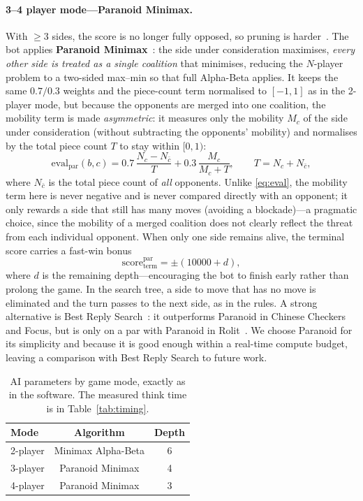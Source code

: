 \paragraph{3--4 player mode---Paranoid Minimax.} With $\ge 3$ sides, the
score is no longer fully opposed, so pruning is
harder~\citep{korf1991multiplayer,sturtevant2000pruning}. The bot applies
\textbf{Paranoid Minimax}~\citep{sturtevant2000pruning,sturtevant2003comparison}:
the side under consideration maximises,
\emph{every other side is treated as a single coalition} that minimises,
reducing the $N$-player problem to a two-sided max--min so that full
Alpha-Beta applies. It keeps the same $0.7/0.3$ weights and the piece-count
term normalised to $[-1,1]$ as in the 2-player mode, but because the
opponents are merged into one coalition, the mobility term is made
\emph{asymmetric}: it measures only the mobility $M_c$ of the side under
consideration (without subtracting the opponents' mobility) and normalises
by the total piece count $T$ to stay within $[0,1)$:
\begin{equation}
\mathrm{eval}_{\text{par}}(b,c)=0.7\,\frac{N_c-N_{\bar c}}{T}
+0.3\,\frac{M_c}{M_c+T},\qquad T=N_c+N_{\bar c},
\label{eq:evalpar}
\end{equation}
where $N_{\bar c}$ is the total piece count of \emph{all} opponents. Unlike
\eqref{eq:eval}, the mobility term here is never negative and is never
compared directly with an opponent; it only rewards a side that still has
many moves (avoiding a blockade)---a pragmatic choice, since the mobility
of a merged coalition does not clearly reflect the threat from each
individual opponent. When only one side remains alive, the terminal score
carries a fast-win bonus
\begin{equation}
\mathrm{score}^{\text{par}}_{\text{term}}=\pm(10000+d),
\label{eq:termpar}
\end{equation}
where $d$ is the remaining depth---encouraging the bot to finish early
rather than prolong the game. In the search tree, a side to move that has no
move is eliminated and the turn passes to the next side, as in the rules. A strong alternative is Best Reply
Search~\citep{schadd2011brs}: it outperforms Paranoid in Chinese Checkers
and Focus, but is only on a par with Paranoid in
Rolit~\citep{schadd2011brs,nijssen2013mcts}. We choose Paranoid for its simplicity and because it is good
enough within a real-time compute budget, leaving a comparison with Best
Reply Search to future work.

\begin{table}[H]
  \centering
  \caption{AI parameters by game mode, exactly as in the software. The
  measured think time is in Table~\ref{tab:timing}.}
  \label{tab:ai_params}
  \begin{tabular}{lcc}
    \toprule
    \textbf{Mode} & \textbf{Algorithm} & \textbf{Depth} \\
    \midrule
    2-player & Minimax Alpha-Beta & 6 \\
    3-player & Paranoid Minimax   & 4 \\
    4-player & Paranoid Minimax   & 3 \\
    \bottomrule
  \end{tabular}
\end{table}

